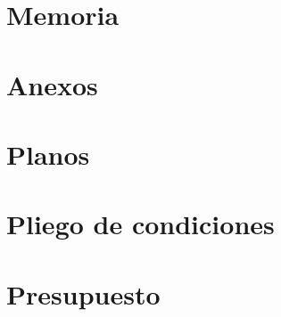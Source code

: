 \documentclass[12pt,titlepage,openright]{report}
\begin{document}
\renewcommand\listtablename{Índice de tablas}
\renewcommand\tablename{Tabla}
\renewcommand\appendixname{Anexo}
\nocite{*}



 \tableofcontents \newpage \listoffigures
\newpage \listoftables \newpage {}


\cleardoublepage

\part{Memoria}











\cleardoublepage

\part{Anexos}
\begin{appendices}

\cleardoublepage

\cleardoublepage

\cleardoublepage

\cleardoublepage
\end{appendices}

\part{Planos}\label{planos}

\cleardoublepage

\part{Pliego de condiciones}

\cleardoublepage

\part{Presupuesto}

\end{document}
